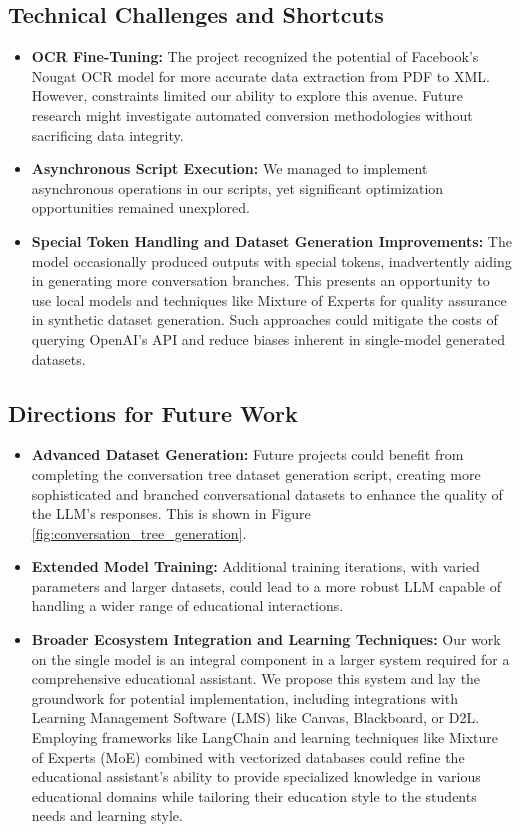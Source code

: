 \documentclass[]{article}
\begin{document}
\subsection{Technical Challenges and Shortcuts}
\begin{itemize}
    \item \textbf{OCR Fine-Tuning:} The project recognized the potential of Facebook's Nougat OCR model for more accurate data extraction from PDF to XML. However, constraints limited our ability to explore this avenue. Future research might investigate automated conversion methodologies without sacrificing data integrity.
    
    \item \textbf{Asynchronous Script Execution:} We managed to implement asynchronous operations in our scripts, yet significant optimization opportunities remained unexplored.
    
    \item \textbf{Special Token Handling and Dataset Generation Improvements:} The model occasionally produced outputs with special tokens, inadvertently aiding in generating more conversation branches. This presents an opportunity to use local models and techniques like Mixture of Experts for quality assurance in synthetic dataset generation. Such approaches could mitigate the costs of querying OpenAI's API and reduce biases inherent in single-model generated datasets.
\end{itemize}

\subsection{Directions for Future Work}
\begin{itemize}
    \item \textbf{Advanced Dataset Generation:} Future projects could benefit from completing the conversation tree dataset generation script, creating more sophisticated and branched conversational datasets to enhance the quality of the LLM's responses. This is shown in Figure \ref{fig:conversation_tree_generation}.
    
    \item \textbf{Extended Model Training:} Additional training iterations, with varied parameters and larger datasets, could lead to a more robust LLM capable of handling a wider range of educational interactions.
    
    \item \textbf{Broader Ecosystem Integration and Learning Techniques:} Our work on the single model is an integral component in a larger system required for a comprehensive educational assistant. We propose this system and lay the groundwork for potential implementation, including integrations with Learning Management Software (LMS) like Canvas, Blackboard, or D2L. Employing frameworks like LangChain and learning techniques like Mixture of Experts (MoE) combined with vectorized databases could refine the educational assistant's ability to provide specialized knowledge in various educational domains while tailoring their education style to the students needs and learning style.
\end{itemize}
\end{document}

